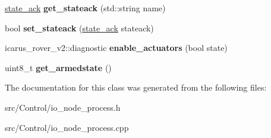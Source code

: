 \begin{DoxyCompactItemize}
\hyperlink{structstate__ack}{state\+\_\+ack} {\bfseries get\+\_\+stateack} (std\+::string name)
\item 
\mbox{\label{classIONodeProcess_a1720304f54575b04340ff0f7370c300a}} 
bool {\bfseries set\+\_\+stateack} (\hyperlink{structstate__ack}{state\+\_\+ack} stateack)
\item 
\mbox{\label{classIONodeProcess_a341f8e94ecb4b982cfc47ff93b1e0472}} 
icarus\+\_\+rover\+\_\+v2\+::diagnostic {\bfseries enable\+\_\+actuators} (bool state)
\item 
\mbox{\label{classIONodeProcess_a568409f0fae3f24c563429b0d605e0fc}} 
uint8\+\_\+t {\bfseries get\+\_\+armedstate} ()
\end{DoxyCompactItemize}


The documentation for this class was generated from the following files\+:\begin{DoxyCompactItemize}
\item 
src/\+Control/io\+\_\+node\+\_\+process.\+h\item 
src/\+Control/io\+\_\+node\+\_\+process.\+cpp\end{DoxyCompactItemize}
